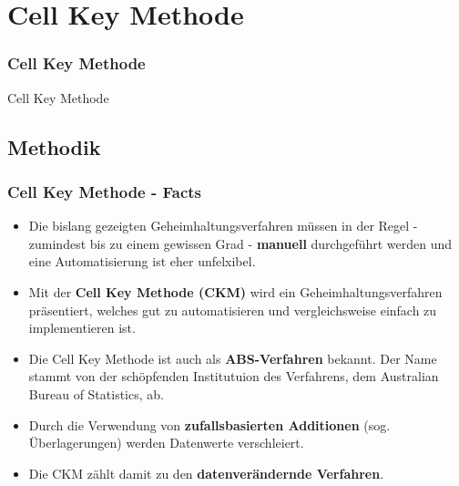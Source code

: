 \documentclass[aspectratio=169]{beamer}
\begin{document}
\section{Cell Key Methode}

\begin{frame}{}
	\frametitle{Cell Key Methode}
    \begin{center}
        \huge Cell Key Methode
    \end{center}
\end{frame}


\subsection{Methodik}

\begin{frame}{}
	\frametitle{Cell Key Methode - Facts}
    \begin{itemize}
        \item Die bislang gezeigten Geheimhaltungsverfahren müssen in der Regel - zumindest bis zu einem gewissen Grad - \textbf{manuell} durchgeführt werden und eine Automatisierung ist eher unfelxibel.
        \item Mit der \textbf{Cell Key Methode (CKM)} wird ein Geheimhaltungsverfahren präsentiert, welches gut zu automatisieren und vergleichsweise einfach zu implementieren ist.
        \item Die Cell Key Methode ist auch als \textbf{ABS-Verfahren} bekannt. Der Name stammt von der schöpfenden Institutuion des Verfahrens, dem Australian Bureau of Statistics, ab.
        \item Durch die Verwendung von \textbf{zufallsbasierten Additionen} (sog. Überlagerungen) werden Datenwerte verschleiert. 
        \item Die CKM zählt damit zu den \textbf{datenverändernde Verfahren}.
    \end{itemize}
\end{frame}
\end{document}
